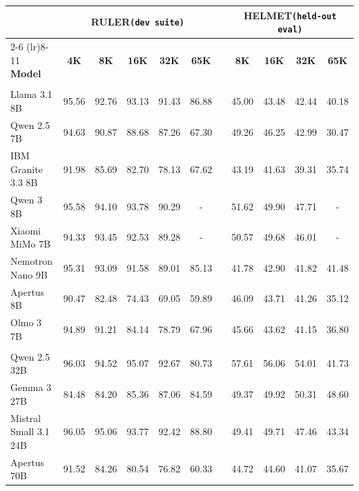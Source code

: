 \documentclass[table]{ai2style/ai2}
\begin{document}
\begin{table}[h]
\centering
\begin{tabular}{lcccccp{0.2em}cccc}
\toprule
 & \multicolumn{5}{c}{\textbf{RULER}\quad\textcolor{neutralFive}{\small\texttt{(dev suite)}}} && \multicolumn{4}{c}{\textbf{HELMET}\quad\textcolor{neutralFive}{\small\texttt{(held-out eval)}}} \\
\cmidrule(lr){2-6} \cmidrule(lr){8-11}
\textbf{Model} & \textbf{4K} & \textbf{8K} & \textbf{16K} & \textbf{32K} & \textbf{65K} && \textbf{8K} & \textbf{16K} & \textbf{32K} & \textbf{65K} \\
\midrule
\rowcolor{midgrey} \multicolumn{11}{c}{\textbf{7B scale}} \\
\rowcolor{lightgrey} Llama 3.1 8B & 95.56 & 92.76 & 93.13 & 91.43 & 86.88 && 45.00 & 43.48 & 42.44 & 40.18 \\
\rowcolor{lightgrey} Qwen 2.5 7B & 94.63 & 90.87 & 88.68 & 87.26 & 67.30 && 49.26 & 46.25 & 42.99 & 30.47 \\
\rowcolor{lightgrey} IBM Granite 3.3 8B & 91.98 & 85.69 & 82.70 & 78.13 & 67.62 && 43.19 & 41.63 & 39.31 & 35.74 \\
\rowcolor{lightgrey} Qwen 3 8B & 95.58 & 94.10 & 93.78 & 90.29 & - && 51.62 & 49.90 & 47.71 & - \\
\rowcolor{lightgrey} Xiaomi MiMo 7B & 94.33 & 93.45 & 92.53 & 89.28 & - && 50.57 & 49.68 & 46.01 & - \\
\rowcolor{lightgrey} Nemotron Nano 9B & 95.31 & 93.09 & 91.58 & 89.01 & 85.13 && 41.78 & 42.90 & 41.82 & 41.48 \\
\rowcolor{lightgrey} Apertus 8B & 90.47 & 82.48 & 74.43 & 69.05 & 59.89 && 46.09 & 43.71 & 41.26 & 35.12 \\
\rowcolor{ai2lightpink} Olmo 3 7B & 94.89 & 91.21 & 84.14 & 78.79 & 67.96 && 45.66 & 43.62 & 41.15 & 36.80 \\
\midrule
\rowcolor{midgrey} \multicolumn{11}{c}{\textbf{32B scale}} \\
\rowcolor{lightgrey} Qwen 2.5 32B & 96.03 & 94.52 & 95.07 & 92.67 & 80.73 && 57.61 & 56.06 & 54.01 & 41.73 \\
\rowcolor{lightgrey} Gemma 3 27B & 84.48 & 84.20 & 85.36 & 87.06 & 84.59 && 49.37 & 49.92 & 50.31 & 48.60 \\
\rowcolor{lightgrey} Mistral Small 3.1 24B & 96.05 & 95.06 & 93.77 & 92.42 & 88.80 && 49.41 & 49.71 & 47.46 & 43.34 \\
\rowcolor{lightgrey} Apertus 70B & 91.52 & 84.26 & 80.54 & 76.82 & 60.33 && 44.72 & 44.60 & 41.07 & 35.67 \\

\end{tabular}
\end{table}
\end{document}
